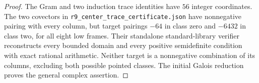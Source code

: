 \begin{proof}
The Gram and two induction trace identities have $56$ integer
coordinates. The two covectors in
\texttt{r9\_center\_trace\_certificate.json} have nonnegative
pairing with every column, but target pairings $-64$ in class zero
and $-6432$ in class two, for all eight low frames. Their standalone
standard-library verifier reconstructs every bounded domain and
every positive semidefinite condition with exact rational
arithmetic. Neither target is a nonnegative combination of its
columns, excluding both possible pointed classes.
The initial Galois reduction proves the general complex assertion.
\end{proof}
